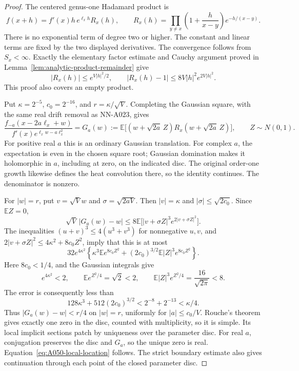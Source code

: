 \begin{proof}
The centered genus-one Hadamard product is
\[
 f(x+h)=f'(x)h\,e^{\ell_xh}R_x(h),\qquad
 R_x(h)=\prod_{y\ne x}
       \left(1+\frac h{x-y}\right)e^{-h/(x-y)}.
\]
There is no exponential term of degree two or higher.
The constant and linear terms are fixed by the two displayed
derivatives. The convergence follows from \(S_x<\infty\).
Exactly the elementary factor estimate and Cauchy argument
proved in Lemma~\ref{lem:analytic-product-remainder} give
\[
 |R_x(h)|\le e^{V|h|^2/2},\qquad
 |R_x(h)-1|\le8V|h|^2e^{2V|h|^2}.
\]
This proof also covers an empty product.

Put \(\kappa=2^{-5}\), \(c_0=2^{-16}\), and
\(r=\kappa/\sqrt V\). Completing the Gaussian square,
with the same real drift removal as NN-A023, gives
\begin{equation}\label{eq:A050-drift-identity}
 \frac{f_{-a}(x-2a\ell_x+w)}
       {f'(x)e^{\ell_xw-a\ell_x^2}}
   =G_a(w):=
       \mathbb E\bigl[(w+\sqrt{2a}\,Z)
                         R_x(w+\sqrt{2a}\,Z)\bigr],
                    \qquad Z\sim N(0,1).
\end{equation}
For positive real \(a\) this is an ordinary Gaussian
translation. For complex \(a\), the expectation is even
in the chosen square root; Gaussian domination makes it
holomorphic in \(a\), including at zero, on the indicated
disc. The original order-one growth likewise defines
the heat convolution there, so the identity continues.
The denominator is nonzero.

For \(|w|=r\), put \(v=\sqrt Vw\) and
\(\sigma=\sqrt{2aV}\). Then \(|v|=\kappa\) and
\(|\sigma|\le\sqrt{2c_0}\). Since \(\mathbb E Z=0\),
\[
 \sqrt V\,|G_a(w)-w|
 \le8\mathbb E\bigl[|v+\sigma Z|^3
                             e^{2|v+\sigma Z|^2}\bigr].
\]
The inequalities
\((u+v)^3\le4(u^3+v^3)\) for nonnegative \(u,v\), and
\(2|v+\sigma Z|^2\le4\kappa^2+8c_0Z^2\), imply that
this is at most
\[
 32e^{4\kappa^2}
 \left\{\kappa^3\mathbb E e^{8c_0Z^2}
       +(2c_0)^{3/2}\mathbb E|Z|^3e^{8c_0Z^2}\right\}.
\]
Here \(8c_0<1/4\), and the Gaussian integrals give
\[
 e^{4\kappa^2}<2,\qquad
 \mathbb E e^{Z^2/4}=\sqrt2<2,\qquad
 \mathbb E|Z|^3e^{Z^2/4}=\frac{16}{\sqrt{2\pi}}<8.
\]
The error is consequently less than
\[
 128\kappa^3+512(2c_0)^{3/2}
       <2^{-8}+2^{-13}<\kappa/4.
\]
Thus \(|G_a(w)-w|<r/4\) on \(|w|=r\), uniformly for
\(|a|\le c_0/V\). Rouche's theorem gives exactly one
zero in the disc, counted with multiplicity, so it is
simple. Its local implicit sections patch by uniqueness
over the parameter disc. For real \(a\), conjugation
preserves the disc and \(G_a\), so the unique zero is
real. Equation~\eqref{eq:A050-local-location} follows.
The strict boundary estimate also gives continuation
through each point of the closed parameter disc.
\end{proof}

